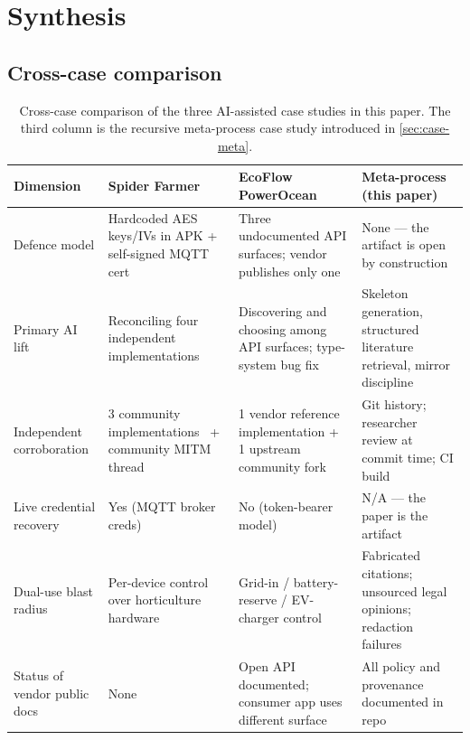 \documentclass[11pt,a4paper]{article}
\begin{document}
\section{Synthesis}
\label{sec:synthesis}

\subsection{Cross-case comparison}
\label{sec:synthesis-table}

\begin{table}[ht]
\centering
\caption{Cross-case comparison of the three AI-assisted case studies in
this paper. The third column is the recursive meta-process case study
introduced in \cref{sec:case-meta}.}
\label{tab:cross-case}
\footnotesize
\begin{tabular}{p{2.6cm} p{3.6cm} p{3.6cm} p{3.6cm}}
\toprule
\textbf{Dimension} & \textbf{Spider Farmer} & \textbf{EcoFlow PowerOcean} & \textbf{Meta-process (this paper)} \\
\midrule
Defence model
  & Hardcoded AES keys/IVs in APK + self-signed MQTT cert
  & Three undocumented API surfaces; vendor publishes only one
  & None --- the artifact is open by construction \\
Primary AI lift
  & Reconciling four independent implementations
  & Discovering and choosing among API surfaces; type-system bug fix
  & Skeleton generation, structured literature retrieval, mirror discipline \\
Independent corroboration
  & 3 community implementations~\citep{smurfy_esphome_sf,p0rigth_spiderblebridge,pythonspidercontroller} + community MITM thread
  & 1 vendor reference implementation + 1 upstream community fork~\citep{niltrip_powerocean}
  & Git history; researcher review at commit time; CI build \\
Live credential recovery
  & Yes (MQTT broker creds)
  & No (token-bearer model)
  & N/A --- the paper is the artifact \\
Dual-use blast radius
  & Per-device control over horticulture hardware
  & Grid-in / battery-reserve / EV-charger control
  & Fabricated citations; unsourced legal opinions; redaction failures \\
Status of vendor public docs
  & None
  & Open API documented; consumer app uses different surface
  & All policy and provenance documented in repo \\
\bottomrule
\end{tabular}
\end{table}
\end{document}
